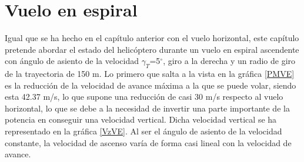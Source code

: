 \chapter{Vuelo en espiral}

Igual que se ha hecho en el capítulo anterior con el vuelo horizontal, este capítulo pretende abordar el estado del helicóptero durante un vuelo en espiral ascendente con ángulo de asiento de la velocidad $\gamma_T$=5$^\circ$, giro a la derecha y un radio de giro de la trayectoria de 150 m.
Lo primero que salta a la vista en la gráfica \ref{PMVE} es la reducción de la velocidad de avance máxima a la que se puede volar, siendo esta 42.37 m/s, lo que supone una reducción de casi 30 m/s respecto al vuelo horizontal, lo que se debe a la necesidad de invertir una parte importante de la potencia en conseguir una velocidad vertical. Dicha velocidad vertical se ha representado en la gráfica \ref{VzVE}. Al ser el ángulo de asiento de la velocidad constante, la velocidad de ascenso varía de forma casi lineal con la velocidad de avance.

